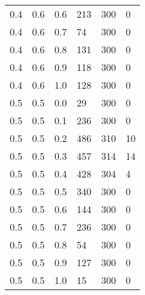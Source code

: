 \begin{table}[!htb]
\begin{minipage}{.45\linewidth}
\begin{tabular}{||p{}p{}p{}p{}p{}p{}||}
			0.4 & 0.6 & 0.6 & 213 & 300 & 0 \\ 
			0.4 & 0.6 & 0.7 & 74 & 300 & 0 \\ 
			0.4 & 0.6 & 0.8 & 131 & 300 & 0 \\ 
			0.4 & 0.6 & 0.9 & 118 & 300 & 0 \\ 
			0.4 & 0.6 & 1.0 & 128 & 300 & 0  \\ \hline
			0.5 & 0.5 & 0.0 & 29 & 300 & 0 \\ 
			0.5 & 0.5 & 0.1 & 236 & 300 & 0 \\ 
			0.5 & 0.5 & 0.2 & 486 & 310 & 10 \\ 
			0.5 & 0.5 & 0.3 & 457 & 314 & 14 \\ 
			0.5 & 0.5 & 0.4 & 428 & 304 & 4 \\ 
			0.5 & 0.5 & 0.5 & 340 & 300 & 0 \\ 
			0.5 & 0.5 & 0.6 & 144 & 300 & 0 \\ 
			0.5 & 0.5 & 0.7 & 236 & 300 & 0 \\ 
			0.5 & 0.5 & 0.8 & 54 & 300 & 0 \\ 
			0.5 & 0.5 & 0.9 & 127 & 300 & 0 \\ 
			0.5 & 0.5 & 1.0 & 15 & 300 & 0  \\ \hline
		\end{tabular}
	\end{minipage} 
\end{table} 

